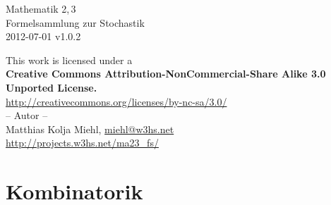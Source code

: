 \documentclass[a4paper,10pt,titlepage]{scrartcl}
\makeatletter
\newcommand{\projectURL}{http://projects.w3hs.net/ma23\_fs/}
\newcommand{\thisdocDATE}{2012-07-01 v1.0.2}
\newcommand{\myNAME}{Matthias Kolja Miehl}
\newcommand{\myEMAIL}{miehl@w3hs.net}
\makeatother
\begin{document}

\begin{titlepage}
  \vspace*{\fill}
  \begin{center}
    \huge
    Mathematik 2,\,3\\
    Formelsammlung zur Stochastik\\
    \vspace{1.5cm}
    \large
    \thisdocDATE
  \end{center}
  \vspace*{\fill}
  \begin{center}{\fontsize{9pt}{11pt}\selectfont
    This work is licensed under a\\[1em]
    \textbf{Creative Commons Attribution-NonCommercial-Share Alike 3.0 Unported License.\\[1em]}
    \url{http://creativecommons.org/licenses/by-nc-sa/3.0/}\\
  }
  \vspace*{\fill}
%
  -- Autor -- \medskip\\
  \myNAME, \href{mailto:\myEMAIL}{\myEMAIL}\smallskip\\
  \url{\projectURL}
  \vspace*{1.4cm}
  \end{center}
\end{titlepage}

\newpage

\setcounter{page}{1}


\section*{Kombinatorik}
\label{sec:kombinatorik}
\end{document}
